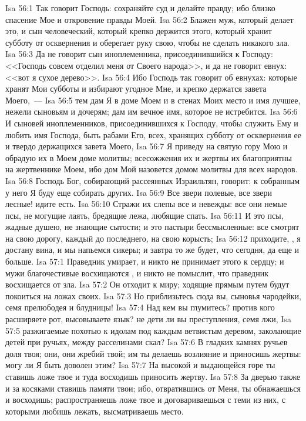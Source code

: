 \vs Isa 56:1 Так говорит Господь: сохраняйте суд и делайте правду; ибо близко спасение Мое и откровение правды Моей.
\vs Isa 56:2 Блажен муж, который делает это, и сын человеческий, который крепко держится этого, который хранит субботу от осквернения и оберегает руку свою, чтобы не сделать никакого зла.
\vs Isa 56:3 Да не говорит сын иноплеменника, присоединившийся к Господу: <<Господь совсем отделил меня от Своего народа>>, и да не говорит евнух: <<вот я сухое дерево>>.
\vs Isa 56:4 Ибо Господь так говорит об евнухах: которые хранят Мои субботы и избирают угодное Мне, и крепко держатся завета Моего,~---
\vs Isa 56:5 тем дам Я в доме Моем и в стенах Моих место и имя лучшее, нежели сыновьям и дочерям; дам им вечное имя, которое не истребится.
\vs Isa 56:6 И сыновей иноплеменников, присоединившихся к Господу, чтобы служить Ему и любить имя Господа, быть рабами Его, всех, хранящих субботу от осквернения ее и твердо держащихся завета Моего,
\vs Isa 56:7 Я приведу на святую гору Мою и обрадую их в Моем доме молитвы; всесожжения их и жертвы их  благоприятны на жертвеннике Моем, ибо дом Мой назовется домом молитвы для всех народов.
\rsbpar\vs Isa 56:8 Господь Бог, собирающий рассеянных Израильтян, говорит: к собранным у него Я буду еще собирать других.
\vs Isa 56:9 Все звери полевые, все звери лесные! идите есть.
\vs Isa 56:10 Стражи их слепы все и невежды: все они немые псы, не могущие лаять, бредящие лежа, любящие спать.
\vs Isa 56:11 И это псы, жадные душею, не знающие сытости; и это пастыри бессмысленные: все смотрят на свою дорогу, каждый до последнего, на свою корысть;
\vs Isa 56:12 приходите, , я достану вина, и мы напьемся сикеры; и завтра то же будет, что сегодня, да еще и больше.
\vs Isa 57:1 Праведник умирает, и никто не принимает этого к сердцу; и мужи благочестивые восхищаются , и никто не помыслит, что праведник восхищается от зла.
\vs Isa 57:2 Он отходит к миру; ходящие прямым путем будут покоиться на ложах своих.
\vs Isa 57:3 Но приблизьтесь сюда вы, сыновья чародейки, семя прелюбодея и блудницы!
\vs Isa 57:4 Над кем вы глумитесь? против кого расширяете рот, высовываете язык? не дети ли вы преступления, семя лжи,
\vs Isa 57:5 разжигаемые похотью к идолам под каждым ветвистым деревом, заколающие детей при ручьях, между расселинами скал?
\vs Isa 57:6 В гладких камнях ручьев доля твоя; они, они жребий твой; им ты делаешь возлияние и приносишь жертвы: могу ли Я быть доволен этим?
\vs Isa 57:7 На высокой и выдающейся горе ты ставишь ложе твое и туда восходишь приносить жертву.
\vs Isa 57:8 За дверью также и за косяками ставишь памяти твои; ибо, отвратившись от Меня, ты обнажаешься и восходишь; распространяешь ложе твое и договариваешься с теми из них, с которыми любишь лежать, высматриваешь место.
